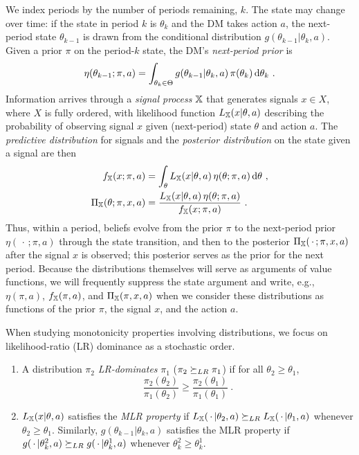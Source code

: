We index periods by the number of periods remaining, $k$. The state may
change over time: if the state in period $k$ is $\theta_k$ and the DM
takes action $a$, the next-period state $\theta_{k-1}$ is drawn from the
conditional distribution $g(\theta_{k-1}|\theta_k, a)$. Given a prior
$\pi$ on the period-$k$ state, the DM's \emph{next-period prior} is
\begin{equation}
\eta(\theta_{k-1}; \pi, a)
  = \int_{\theta_k \in \Theta} g(\theta_{k-1}|\theta_k, a)\,
    \pi(\theta_k) \mathop{}\!\mathrm{d} \theta_k \ . \label{eq:eta}
\end{equation}
Information arrives through a \emph{signal process} ${\mathbb{X}}$ that generates
signals $x \in X$, where $X$ is fully ordered, with likelihood function
$L_{\mathbb{X}}(x|\theta, a)$ describing the probability of observing signal $x$
given (next-period) state $\theta$ and action $a$. The \emph{predictive
distribution} for signals and the \emph{posterior distribution} on the
state given a signal are then
\begin{align}
f_{\mathbb{X}}(x;\pi, a) &= \int_\theta L_{\mathbb{X}}(x|\theta,a)\, \eta(\theta; \pi, a)
  \mathop{}\!\mathrm{d} \theta \ , \label{eq:predictive}\\
\Pi_{\mathbb{X}}(\theta; \pi, x, a) &=
  \frac{L_{\mathbb{X}}(x|\theta,a)\, \eta(\theta; \pi, a)}{f_{\mathbb{X}}(x;\pi, a)} \ .
  \label{eq:posterior}
\end{align}
Thus, within a period, beliefs evolve from the prior $\pi$ to the
next-period prior $\eta(\,\cdot\,; \pi, a)$ through the state
transition, and then to the posterior $\Pi_{\mathbb{X}}(\,\cdot\,; \pi, x, a)$
after the signal $x$ is observed; this posterior serves as the prior for
the next period. Because the distributions themselves will serve as
arguments of value functions, we will frequently suppress the state
argument and write, e.g., $\eta(\pi,a)$, $f_{\mathbb{X}}(\pi,a)$, and
$\Pi_{\mathbb{X}}(\pi,x,a)$ when we consider these distributions as functions of
the prior $\pi$, the signal $x$, and the action $a$.

When studying monotonicity properties involving distributions, we focus
on likelihood-ratio (LR) dominance as a stochastic order.

\begin{definition}\label{def:LR}\quad
\begin{enumerate}
\item A distribution $\pi_2$ \emph{LR-dominates} $\pi_1$
  ($\pi_2 \succeq_{LR} \pi_1$) if for all $\theta_2 \geq \theta_1$,
  \begin{equation}
  \frac{\pi_2(\theta_2)}{\pi_1(\theta_2)} \geq
  \frac{\pi_2(\theta_1)}{\pi_1(\theta_1)} \ . \label{eq:LRdef}
  \end{equation}
\item $L_{\mathbb{X}}(x|\theta, a)$ satisfies the \emph{MLR property} if
  $L_{\mathbb{X}}(\,\cdot\,|\theta_2, a) \succeq_{LR} L_{\mathbb{X}}(\,\cdot\,|\theta_1, a)$
  whenever $\theta_2 \geq \theta_1$. Similarly, $g(\theta_{k-1}|
  \theta_k, a)$ satisfies the MLR property if
  $g(\,\cdot\,|\theta_k^2, a) \succeq_{LR} g(\,\cdot\,|\theta_k^1, a)$ whenever
  $\theta_k^2 \geq \theta_k^1$.
\end{enumerate}
\end{definition}

